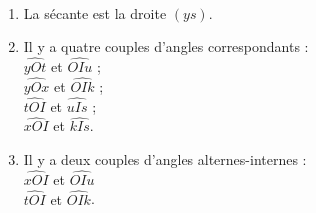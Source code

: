    \ \\ [-5mm]
   \begin{enumerate}
       \item La sécante est {\blue la droite $(ys)$}.
       \item Il y a quatre couples d'angles correspondants : \\
          {\blue $\widehat{yOt}$ et $\widehat{OIu}$ ; \\
          $\widehat{yOx}$ et $\widehat{OIk}$ ; \\
          $\widehat{tOI}$ et $\widehat{uIs}$ ; \\
          $\widehat{xOI}$ et $\widehat{kIs}$}.
       \item Il y a deux couples d'angles alternes-internes : \\
          {\blue $\widehat{xOI}$ et $\widehat{OIu}$ \\
          $\widehat{tOI}$ et $\widehat{OIk}$}.
   \end{enumerate}
